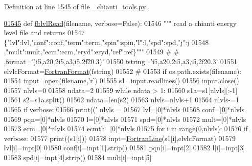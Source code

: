Definition at line \hyperlink{__chianti__tools_8py_source_l01545}{1545} of file \hyperlink{__chianti__tools_8py_source}{\+\_\+chianti\+\_\+tools.\+py}.


\begin{DoxyCode}
\hypertarget{namespacepyneb_1_1utils_1_1__chianti__tools_l01545}{}\hyperlink{namespacepyneb_1_1utils_1_1__chianti__tools_a63235035cef376c49a1f4e81933452a6}{01545} \textcolor{keyword}{def }\hyperlink{namespacepyneb_1_1utils_1_1__chianti__tools_a63235035cef376c49a1f4e81933452a6}{fblvlRead}(filename, verbose=False):
01546     \textcolor{stringliteral}{""" read a chianti energy level file and returns}
01547 \textcolor{stringliteral}{    \{"lvl":lvl,"conf":conf,"term":term,"spin":spin,"l":l,"spd":spd,"j":j}
01548 \textcolor{stringliteral}{    ,"mult":mult,"ecm":ecm,"eryd":eryd,"ref":ref\}"""}
01549 \textcolor{comment}{#        #  ,format='(i5,a20,2i5,a3,i5,2f20.3)'}
01550     fstring=\textcolor{stringliteral}{'i5,a20,2i5,a3,i5,2f20.3'}
01551     elvlcFormat=\hyperlink{classpyneb_1_1utils_1_1_fortran_format_1_1_fortran_format}{FortranFormat}(fstring)
01552     \textcolor{comment}{#}
01553     \textcolor{keywordflow}{if} os.path.exists(filename):
01554         input=open(filename,\textcolor{stringliteral}{'}\textcolor{stringliteral}{r')}
01555 \textcolor{stringliteral}{        s1=input.readlines()}
01556 \textcolor{stringliteral}{        input.close()}
01557 \textcolor{stringliteral}{        nlvls=0}
01558 \textcolor{stringliteral}{        ndata=2}
01559 \textcolor{stringliteral}{        }\textcolor{keywordflow}{while} ndata > 1:
01560             s1a=s1[nlvls][:-1]
01561             s2=s1a.split()
01562             ndata=len(s2)
01563             nlvls=nlvls+1
01564         nlvls-=1
01565         \textcolor{keywordflow}{if} verbose:
01566             print((\textcolor{stringliteral}{' nlvls = %
01567         lvl=[0]*nlvls
01568         conf=[0]*nlvls
01569         pqn=[0]*nlvls
01570         l=[0]*nlvls
01571         spd=[0]*nlvls
01572         mult=[0]*nlvls
01573         ecm=[0]*nlvls
01574         ecmth=[0]*nlvls
01575         \textcolor{keywordflow}{for} i \textcolor{keywordflow}{in} range(0,nlvls):
01576             \textcolor{keywordflow}{if} verbose:
01577                 print((s1[i]))
01578             inpt=\hyperlink{classpyneb_1_1utils_1_1_fortran_format_1_1_fortran_line}{FortranLine}(s1[i],elvlcFormat)
01579             lvl[i]=inpt[0]
01580             conf[i]=inpt[1].strip()
01581             pqn[i]=inpt[2]
01582             l[i]=inpt[3]
01583             spd[i]=inpt[4].strip()
01584             mult[i]=inpt[5]
}
\end{DoxyCode}
